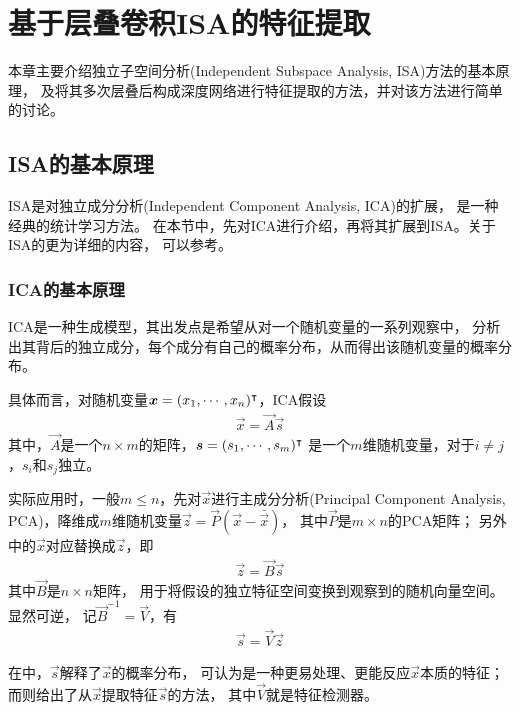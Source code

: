 
\chapter{基于层叠卷积ISA的特征提取\label{chap:ISA}}
本章主要介绍独立子空间分析(Independent Subspace Analysis, ISA)方法的基本原理，
及将其多次层叠后构成深度网络进行特征提取的方法，并对该方法进行简单的讨论。

\section{ISA的基本原理}
ISA是对独立成分分析(Independent Component Analysis, ICA)的扩展，
是一种经典的统计学习方法。
在本节中，先对ICA进行介绍，再将其扩展到ISA。关于ISA的更为详细的内容，
可以参考\cite{hyvarinen2009natural}。


\subsection{ICA的基本原理}
ICA是一种生成模型，其出发点是希望从对一个随机变量的一系列观察中，
分析出其背后的独立成分，每个成分有自己的概率分布，从而得出该随机变量的概率分布。

具体而言，对随机变量$\boldsymbol{x} = (x_1, \cdots, x_n)^\intercal$，ICA假设
\begin{eqnarray}
    \vec{x} = \vec{A}\vec{s}
    \label{eqn:ica:0}
\end{eqnarray}
其中，$\vec{A}$是一个$n\times m$的矩阵，$\boldsymbol{s}=(s_1,\cdots,s_m)^\intercal$
是一个$m$维随机变量，对于$i\neq j$，$s_i$和$s_j$独立。

实际应用时，一般$m \le n$，先对$\vec{x}$进行主成分分析(Principal Component
Analysis, PCA)，降维成$m$维随机变量$\vec{z}=\vec{P}(\vec{x}-\bar{\vec{x}})$，
其中$\vec{P}$是$m \times n$的PCA矩阵；
另外中的$\vec{x}$对应替换成$\vec{z}$，即
\begin{eqnarray}
    \vec{z} = \vec{B}\vec{s}
    \label{eqn:ica:1}
\end{eqnarray}
其中$\vec{B}$是$n\times n$矩阵，
用于将假设的独立特征空间变换到观察到的随机向量空间。显然可逆，
记$\vec{B}^{-1}=\vec{V}$，有
\begin{eqnarray}
    \vec{s} = \vec{V}\vec{z}
    \label{eqn:ica:2}
\end{eqnarray}

在中，$\vec{s}$解释了$\vec{x}$的概率分布，
可认为是一种更易处理、更能反应$\vec{x}$本质的特征；
而则给出了从$\vec{x}$提取特征$\vec{s}$的方法，
其中$\vec{V}$就是特征检测器。

